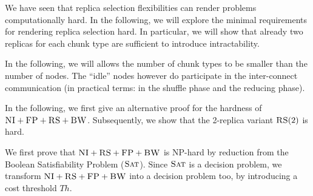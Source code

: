 \documentclass[9pt]{sigcomm-alternate}
\newcommand{\maciek}[1]{\textcolor{brown}{maciek: #1}}
\newcommand{\CC}{\textsc{NI}}
\newcommand{\FP}{\textsc{FP}}
\newcommand{\RS}{\textsc{RS}}
\newcommand{\BW}{\textsc{BW}}
\newcommand{\MA}{\textsc{MA}}
\newcommand{\SAT}{\textsc{Sat}}
\newcommand{\Thr}{\ensuremath{Th}}
\begin{document}
\begin{appendix}
We have seen that replica selection flexibilities can render problems computationally hard.
In the following, we will explore the minimal requirements for rendering replica selection hard.
In particular, we will show that already two replicas for each chunk type are sufficient to
introduce intractability.

In the following, we will allows the number of chunk types to be smaller than the number of nodes.
 The ``idle'' nodes however do participate in the inter-connect communication (in practical terms: in the shuffle phase
 and the reducing phase). 



In the following, we first give an alternative proof for the hardness of $\CC+\FP+\RS+\BW$.
Subsequently, we show that the 2-replica variant $\RS(2)$ is hard.



We first prove that $\CC+\RS+\FP+\BW$ is NP-hard by reduction from the Boolean Satisfiability Problem ($\SAT$).
Since $\SAT$ is a decision
problem, we transform $\CC+\RS+\FP+\BW$ into a decision problem too, by
introducing a cost threshold $\Thr$.


\end{appendix}
\end{document}
